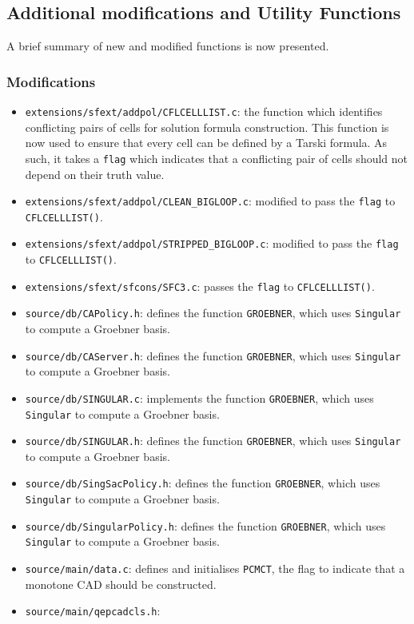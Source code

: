 \documentclass[
]{book}
\theoremstyle{definition}
\theoremstyle{definition}
\theoremstyle{definition}
\theoremstyle{definition}
\theoremstyle{remark}
\begin{document}
\hypertarget{additional-modifications-and-utility-functions}{%
\subsection{Additional modifications and Utility Functions}\label{additional-modifications-and-utility-functions}}

A brief summary of new and modified functions is now presented.

\hypertarget{modifications}{%
\subsubsection{Modifications}\label{modifications}}

\begin{itemize}
\item
  \texttt{extensions/sfext/addpol/CFLCELLLIST.c}: the function which identifies conflicting pairs of cells for solution formula construction. This function is now used to ensure that every cell can be defined by a Tarski formula. As such, it takes a \texttt{flag} which indicates that a conflicting pair of cells should not depend on their truth value.
\item
  \texttt{extensions/sfext/addpol/CLEAN\_BIGLOOP.c}: modified to pass the \texttt{flag} to \texttt{CFLCELLLIST()}.
\item
  \texttt{extensions/sfext/addpol/STRIPPED\_BIGLOOP.c}: modified to pass the \texttt{flag} to \texttt{CFLCELLLIST()}.
\item
  \texttt{extensions/sfext/sfcons/SFC3.c}: passes the \texttt{flag} to \texttt{CFLCELLLIST()}.
\item
  \texttt{source/db/CAPolicy.h}: defines the function \texttt{GROEBNER}, which uses \texttt{Singular} to compute a Groebner basis.
\item
  \texttt{source/db/CAServer.h}: defines the function \texttt{GROEBNER}, which uses \texttt{Singular} to compute a Groebner basis.
\item
  \texttt{source/db/SINGULAR.c}: implements the function \texttt{GROEBNER}, which uses \texttt{Singular} to compute a Groebner basis.
\item
  \texttt{source/db/SINGULAR.h}: defines the function \texttt{GROEBNER}, which uses \texttt{Singular} to compute a Groebner basis.
\item
  \texttt{source/db/SingSacPolicy.h}: defines the function \texttt{GROEBNER}, which uses \texttt{Singular} to compute a Groebner basis.
\item
  \texttt{source/db/SingularPolicy.h}: defines the function \texttt{GROEBNER}, which uses \texttt{Singular} to compute a Groebner basis.
\item
  \texttt{source/main/data.c}: defines and initialises \texttt{PCMCT}, the flag to indicate that a monotone CAD should be constructed.
\item
  \texttt{source/main/qepcadcls.h}:


\end{itemize}
\end{document}
